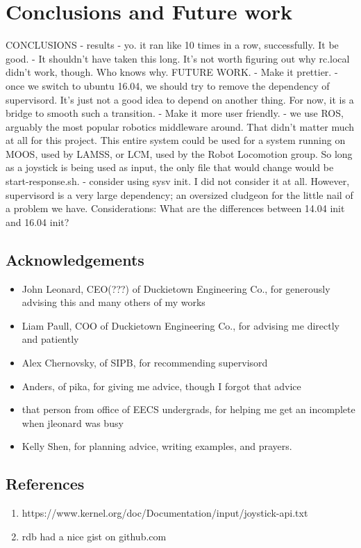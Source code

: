 \documentclass[titlepage]{article}
\begin{document}
\section{Conclusions and Future work}
CONCLUSIONS
- results
- yo. it ran like 10 times in a row, successfully. It be good.
- It shouldn't have taken this long. It's not worth figuring out why
  rc.local didn't work, though. Who knows why.
FUTURE WORK. 
- Make it prettier. 
- once we switch to ubuntu 16.04, we should try to remove the dependency of supervisord. It's just not a good idea to depend on another thing. For now, it is a bridge to smooth such a transition. 
- Make it more user friendly. 
- we use ROS, arguably the most popular robotics middleware around. That didn't matter much at all for this project. This entire system could be used for a system running on MOOS, used by LAMSS, or LCM, used by the Robot Locomotion group. So long as a joystick is being used as input, the only file that would change would be start-response.sh.
- consider using sysv init. I did not consider it at all. However, supervisord is a very large dependency; an oversized cludgeon for the little nail of a problem we have. Considerations: What are the differences between 14.04 init and 16.04 init? 
\subsection{Acknowledgements}
\begin{itemize}
\item John Leonard, CEO(???) of Duckietown Engineering Co., for generously advising this and many others of my works
\item Liam Paull, COO of Duckietown Engineering Co., for advising me directly and patiently
\item Alex Chernovsky, of SIPB, for recommending supervisord
\item Anders, of pika, for giving me advice, though I forgot that advice
\item that person from office of EECS undergrads, for helping me get an incomplete when jleonard was busy
\item Kelly Shen, for planning advice, writing examples, and prayers. 
\end{itemize}

\subsection{References}
\begin{enumerate}[(1)]
\item https://www.kernel.org/doc/Documentation/input/joystick-api.txt
\item rdb had a nice gist on github.com
\end{enumerate}
\end{document}
